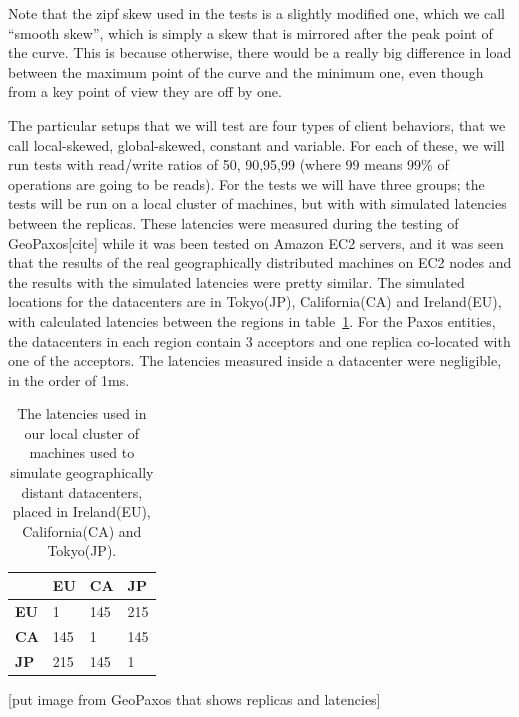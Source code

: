 Note that the zipf skew used in the tests is a slightly modified one, which we call ``smooth skew'', which is simply a skew that is mirrored after the peak point of the curve. This is because otherwise, there would be a really big difference in load between the maximum point of the curve and the minimum one, even though from a key point of view they are off by one.

The particular setups that we will test are four types of client behaviors, that we call local-skewed, global-skewed, constant and variable. For each of these, we will run tests with read/write ratios of 50, 90,95,99 (where 99 means 99\% of operations are going to be reads). For the tests we will have three groups; the tests will be run on a local cluster of machines, but with with simulated latencies between the replicas. These latencies were measured during the testing of GeoPaxos[cite] while it was been tested on Amazon EC2 servers, and it was seen that the results of the real geographically distributed machines on EC2 nodes and the results with the simulated latencies were pretty similar. The simulated locations for the datacenters are in Tokyo(JP), California(CA) and Ireland(EU), with calculated latencies between the regions in table~\ref{tab:latencies}. For the Paxos entities, the datacenters in each region contain 3 acceptors and one replica co-located with one of the acceptors. The latencies measured inside a datacenter were negligible, in the order of 1ms.


\begin{table}[!htb]
  \centering
  \begin{tabular}{l l l l}
    \hline
    & \textbf{EU} & \textbf{CA} & \textbf{JP} \\
    \hline
    \textbf{EU} & 1 & 145 & 215 \\
    \textbf{CA} & 145 & 1 & 145 \\
    \textbf{JP} & 215 & 145 & 1 \\
    \hline
  \end{tabular}
  \caption{The latencies used in our local cluster of machines used to simulate geographically distant datacenters, placed in Ireland(EU), California(CA) and Tokyo(JP).}\label{tab:latencies}
\end{table}

[put image from GeoPaxos that shows replicas and latencies]


